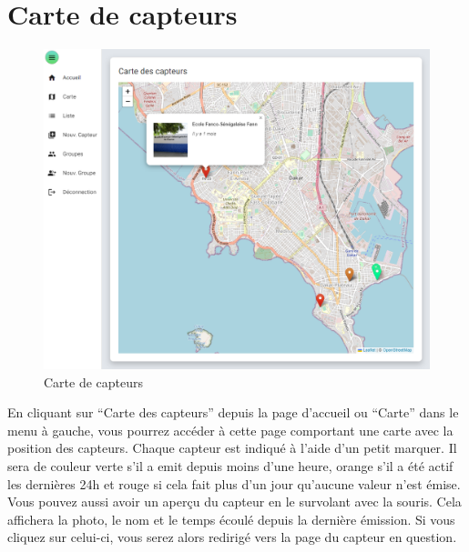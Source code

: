 \section{Carte de capteurs}\label{sec:carte-de-capteurs}

    \begin{figure}[H]
        \begin{center}
            \includegraphics[width=12cm]{resources/map}
        \end{center}
        \caption{Carte de capteurs}
        \label{fig:carte-de-capteurs}
    \end{figure}

    En cliquant sur ``Carte des capteurs'' depuis la page d'accueil ou ``Carte'' dans le menu à gauche,
    vous pourrez accéder à cette page comportant une carte avec la position des capteurs.
    Chaque capteur est indiqué à l'aide d'un petit marquer.
    Il sera de couleur verte s'il a emit depuis moins d'une heure, orange s'il a été actif les dernières 24h
    et rouge si cela fait plus d'un jour qu'aucune valeur n'est émise.
    Vous pouvez aussi avoir un aperçu du capteur en le survolant avec la souris.
    Cela affichera la photo, le nom et le temps écoulé depuis la dernière émission.
    Si vous cliquez sur celui-ci, vous serez alors redirigé vers la page du capteur en question.
